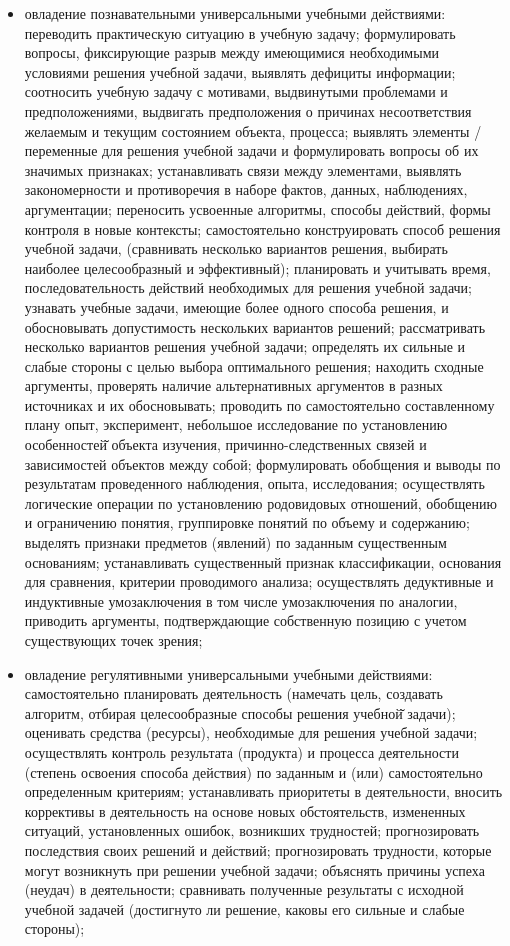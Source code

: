 \documentclass[
  11pt,
  russian,
]{book}
\begin{document}
\begin{itemize}
\item
  овладение познавательными универсальными учебными действиями: переводить практическую ситуацию в учебную задачу; формулировать вопросы, фиксирующие разрыв между имеющимися необходимыми условиями решения учебной задачи, выявлять дефициты информации; соотносить учебную задачу с мотивами, выдвинутыми проблемами и предположениями, выдвигать предположения о причинах несоответствия желаемым и текущим состоянием объекта, процесса; выявлять элементы / переменные для решения учебной задачи и формулировать вопросы об их значимых признаках; устанавливать связи между элементами, выявлять закономерности и противоречия в наборе фактов, данных, наблюдениях, аргументации; переносить усвоенные алгоритмы, способы действий, формы контроля в новые контексты; самостоятельно конструировать способ решения учебной задачи, (сравнивать несколько вариантов решения, выбирать наиболее целесообразный и эффективный); планировать и учитывать время, последовательность действий необходимых для решения учебной задачи; узнавать учебные задачи, имеющие более одного способа решения, и обосновывать допустимость нескольких вариантов решений; рассматривать несколько вариантов решения учебной задачи; определять их сильные и слабые стороны с целью выбора оптимального решения; находить сходные аргументы, проверять наличие альтернативных аргументов в разных источниках и их обосновывать; проводить по самостоятельно составленному плану опыт, эксперимент, небольшое исследование по установлению особенностей̆ объекта изучения, причинно-следственных связей и зависимостей объектов между собой; формулировать обобщения и выводы по результатам проведенного наблюдения, опыта, исследования; осуществлять логические операции по установлению родовидовых отношений, обобщению и ограничению понятия, группировке понятий по объему и содержанию; выделять признаки предметов (явлений) по заданным существенным основаниям; устанавливать существенный признак классификации, основания для сравнения, критерии проводимого анализа; осуществлять дедуктивные и индуктивные умозаключения в том числе умозаключения по аналогии, приводить аргументы, подтверждающие собственную позицию с учетом существующих точек зрения;
\item
  овладение регулятивными универсальными учебными действиями: самостоятельно планировать деятельность (намечать цель, создавать алгоритм, отбирая целесообразные способы решения учебной̆ задачи); оценивать средства (ресурсы), необходимые для решения учебной задачи; осуществлять контроль результата (продукта) и процесса деятельности (степень освоения способа действия) по заданным и (или) самостоятельно определенным критериям; устанавливать приоритеты в деятельности, вносить коррективы в деятельность на основе новых обстоятельств, измененных ситуаций, установленных ошибок, возникших трудностей; прогнозировать последствия своих решений и действий; прогнозировать трудности, которые могут возникнуть при решении учебной задачи; объяснять причины успеха (неудач) в деятельности; сравнивать полученные результаты с исходной учебной задачей (достигнуто ли решение, каковы его сильные и слабые стороны);

\end{itemize}
\end{document}
